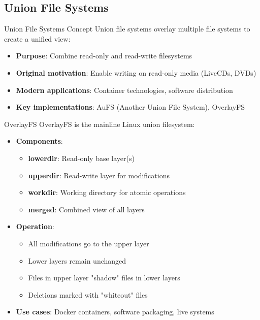 \raggedcolumns
\columnbreak

\subsection{Union File Systems}

\begin{concept}{Union File Systems Concept}
    Union file systems overlay multiple file systems to create a unified view:
    \begin{itemize}
        \item \textbf{Purpose}: Combine read-only and read-write filesystems
        \item \textbf{Original motivation}: Enable writing on read-only media (LiveCDs, DVDs)
        \item \textbf{Modern applications}: Container technologies, software distribution
        \item \textbf{Key implementations}: AuFS (Another Union File System), OverlayFS
    \end{itemize}
\end{concept}

\begin{definition}{OverlayFS}
    OverlayFS is the mainline Linux union filesystem:
    \begin{itemize}
        \item \textbf{Components}:
            \begin{itemize}
                \item \textbf{lowerdir}: Read-only base layer(s)
                \item \textbf{upperdir}: Read-write layer for modifications
                \item \textbf{workdir}: Working directory for atomic operations
                \item \textbf{merged}: Combined view of all layers
            \end{itemize}
        \item \textbf{Operation}:
            \begin{itemize}
                \item All modifications go to the upper layer
                \item Lower layers remain unchanged
                \item Files in upper layer "shadow" files in lower layers
                \item Deletions marked with "whiteout" files
            \end{itemize}
        \item \textbf{Use cases}: Docker containers, software packaging, live systems
    \end{itemize}
\end{definition}

